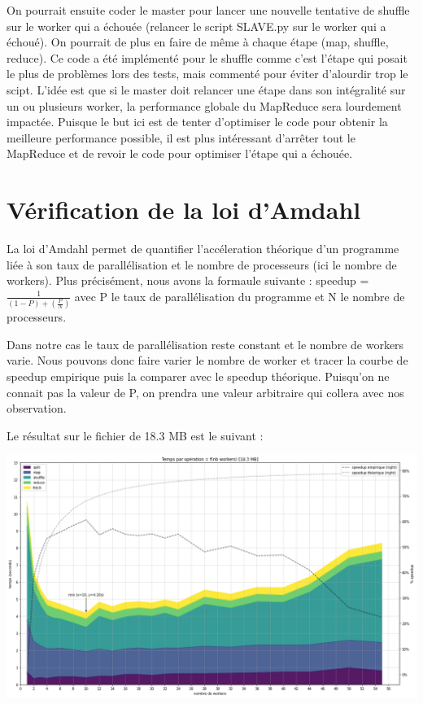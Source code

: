 \documentclass[11pt,a4paper]{article}
\begin{document}
On pourrait ensuite coder le master pour lancer une nouvelle tentative de shuffle sur le worker qui a échouée (relancer le script SLAVE.py sur le worker qui a échoué). On pourrait de plus en faire de même à chaque étape (map, shuffle, reduce). Ce code a été implémenté pour le shuffle comme c'est l'étape qui posait le plus de problèmes lors des tests, mais commenté pour éviter d'alourdir trop le scipt. L'idée est que si le master doit relancer une étape dans son intégralité sur un ou plusieurs worker, la performance globale du MapReduce sera lourdement impactée. Puisque le but ici est de tenter d'optimiser le code pour obtenir la meilleure performance possible, il est plus intéressant d'arrêter tout le MapReduce et de revoir le code pour optimiser l'étape qui a échouée.

\section{Vérification de la loi d'Amdahl}
La loi d'Amdahl permet de quantifier l'accéleration théorique d'un programme liée à son taux de parallélisation et le nombre de processeurs (ici le nombre de workers). Plus précisément, nous avons la formaule suivante : speedup = $\frac{1}{(1-P)+(\frac{P}{N})}$ avec P le taux de parallélisation du programme et N le nombre de processeurs.

Dans notre cas le taux de parallélisation reste constant et le nombre de workers varie. Nous pouvons donc faire varier le nombre de worker et tracer la courbe de speedup empirique puis la comparer avec le speedup théorique. Puisqu'on ne connait pas la valeur de P, on prendra une valeur arbitraire qui collera avec nos observation.

Le résultat sur le fichier de 18.3 MB est le suivant :

\includegraphics[width=\columnwidth]{graph1.png}
\end{document}
